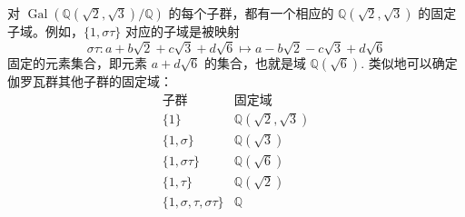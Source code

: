 \begin{example}
对 \(\operatorname{Gal}(\mathbb{Q}(\sqrt{2}, \sqrt{3})/\mathbb{Q})\) 的每个子群，都有一个相应的 \(\mathbb{Q}(\sqrt{2}, \sqrt{3})\) 的固定子域。例如，\(\{1, \sigma\tau\}\) 对应的子域是被映射
\[
\sigma\tau : a+b\sqrt{2}+c\sqrt{3}+d\sqrt{6} \mapsto a-b\sqrt{2}-c\sqrt{3}+d\sqrt{6}
\]
固定的元素集合，即元素 \(a+d\sqrt{6}\) 的集合，也就是域 \(\mathbb{Q}(\sqrt{6})\). 类似地可以确定伽罗瓦群其他子群的固定域：
\[
\begin{array}{ll}
\text{子群} & \text{固定域}\\ \hline
\{1\} & \mathbb{Q}(\sqrt{2}, \sqrt{3})\\
\{1, \sigma\} & \mathbb{Q}(\sqrt{3})\\
\{1, \sigma\tau\} & \mathbb{Q}(\sqrt{6})\\
\{1, \tau\} & \mathbb{Q}(\sqrt{2})\\
\{1, \sigma, \tau, \sigma\tau\} & \mathbb{Q}
\end{array}
\]


\end{example}
